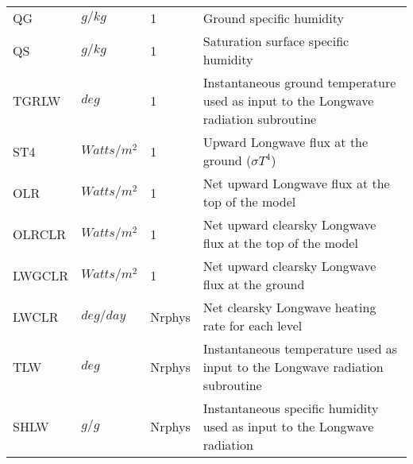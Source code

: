 \begin{tabular}{llll}
 QG        &  $g/kg$ &  1
     &\begin{minipage}[t]{3in}
      {Ground specific humidity}
     \end{minipage}\\
 QS        &  $g/kg$ &  1
     &\begin{minipage}[t]{3in}
      {Saturation surface specific humidity}
     \end{minipage}\\
 TGRLW    &    $deg$   &    1  
     &\begin{minipage}[t]{3in}
      {Instantaneous ground temperature used as input to the
       Longwave radiation subroutine} 
     \end{minipage}\\
 ST4      &   $Watts/m^2$  &    1  
     &\begin{minipage}[t]{3in}
      {Upward Longwave flux at the ground ($\sigma T^4$)}
     \end{minipage}\\
 OLR      &   $Watts/m^2$  &    1  
     &\begin{minipage}[t]{3in}
      {Net upward Longwave flux at the top of the model}
     \end{minipage}\\
 OLRCLR   &   $Watts/m^2$  &    1  
     &\begin{minipage}[t]{3in}
      {Net upward clearsky Longwave flux at the top of the model}
     \end{minipage}\\
 LWGCLR   &   $Watts/m^2$  &    1  
     &\begin{minipage}[t]{3in}
      {Net upward clearsky Longwave flux at the ground}
     \end{minipage}\\
 LWCLR    &  $deg/day$ &  Nrphys 
     &\begin{minipage}[t]{3in}
      {Net clearsky Longwave heating rate for each level}
     \end{minipage}\\
 TLW      &    $deg$   &  Nrphys 
     &\begin{minipage}[t]{3in}
      {Instantaneous temperature used as input to the Longwave radiation
      subroutine} 
     \end{minipage}\\
 SHLW     &    $g/g$   &  Nrphys 
     &\begin{minipage}[t]{3in}
      {Instantaneous specific humidity used as input to the Longwave radiation
}
\end{minipage}
\end{tabular}
